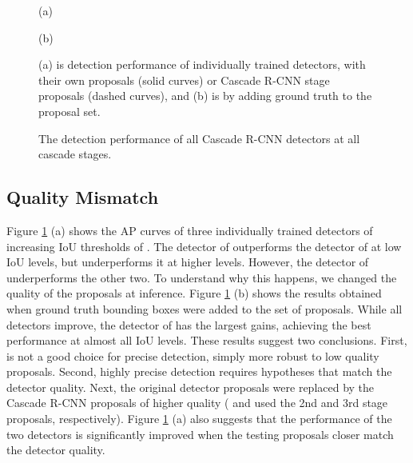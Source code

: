 \documentclass[10pt,twocolumn,letterpaper]{article}
\begin{document}
\begin{figure}[!t]
\begin{minipage}[b]{.48\linewidth}
\centering
\centerline{}{(a)}
\end{minipage}
\hfill
\begin{minipage}[b]{.48\linewidth}
\centering
\centerline{}{(b)}
\end{minipage}
\caption{(a) is detection performance of individually trained detectors, with their own proposals (solid curves) or Cascade R-CNN stage proposals (dashed curves), and (b) is by adding ground truth to the proposal set.}
\label{fig:hypotheses mismatch}
\end{figure}

\begin{figure}[!t]
\begin{minipage}[b]{.3\linewidth}
\centering
\centerline{}
\end{minipage}
\hfill
\begin{minipage}[b]{.3\linewidth}
\centering
\centerline{}
\end{minipage}
\hfill
\begin{minipage}[b]{.3\linewidth}
\centering
\centerline{}
\end{minipage}
\caption{The detection performance of all Cascade R-CNN detectors at all cascade
stages.}
\label{fig:cascade stage}
\end{figure}

\subsection{Quality Mismatch}

Figure \ref{fig:hypotheses mismatch} (a) shows the AP curves of three
individually trained detectors of increasing IoU thresholds of
. The detector of  outperforms the detector
of  at low IoU levels, but underperforms it at higher levels.
However, the detector of  underperforms the other two.
To understand why this happens, we changed the quality of the proposals
at inference. Figure \ref{fig:hypotheses mismatch} (b)
shows the results obtained when ground truth bounding boxes were added to
the set of proposals. While all detectors improve, the detector of 
has the largest gains, achieving the best performance at almost all
IoU levels. These results suggest two conclusions. First,  is not a
good choice for precise detection, simply more robust to low quality
proposals. Second, highly precise detection requires hypotheses that match
the detector quality. Next, the original detector proposals were replaced by the
Cascade R-CNN proposals of higher quality ( and  used the 2nd
and 3rd stage proposals, respectively). Figure \ref{fig:hypotheses mismatch} (a)
also suggests that the performance of the two detectors is significantly
improved when the testing proposals closer match the detector quality.
\end{document}
